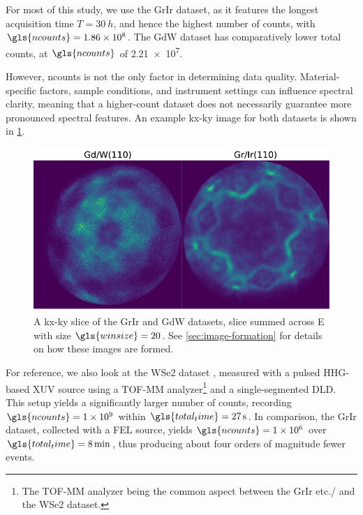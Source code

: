 For most of this study, we use the \gls{GrIr} dataset, as it features the longest acquisition time $T=\qty{30}{h}$, and hence the highest number of counts, with $\gls{ncounts}=\num{1.86e8}$. The \gls{GdW} dataset has comparatively lower total counts, at $\gls{ncounts}$ of \num{2.21e7}. 

However, \gls{ncounts} is not the only factor in determining data quality. Material-specific factors, sample conditions, and instrument settings can influence spectral clarity, meaning that a higher-count dataset does not necessarily guarantee more pronounced spectral features. An example \gls{kx}-\gls{ky} image for both datasets is shown in \cref{fig:all-hextof-datasets-kxky}.

\begin{figure}[h]
    \centering
    \includegraphics[width=1\linewidth]{images/datasets_2_kx_ky.pdf}
    \caption{A \gls{kx}-\gls{ky} slice of the \gls{GrIr} and \gls{GdW} datasets, slice summed across \gls{E} with size $\gls{winsize}=\num{20}$. See \cref{sec:image-formation} for details on how these images are formed.}
    \label{fig:all-hextof-datasets-kxky}
\end{figure}

For reference, we also look at the \gls{WSe2} dataset \cite{maklarTimeresolvedARPESRAW2022}, measured with a pulsed \gls{HHG}-based \gls{XUV} source using a \gls{TOF}-\gls{MM} analyzer\footnote{The \gls{TOF}-\gls{MM} analyzer being the common aspect between the \gls{GrIr} etc./ and the \gls{WSe2} dataset.} and a single-segmented \gls{DLD}. This setup yields a significantly larger number of counts, recording $\gls{ncounts}=\num{1e9}$ within $\gls{total_time}=\qty{27}{s}$. In comparison, the \gls{GrIr} dataset, collected with a \gls{FEL} source, yields $\gls{ncounts} = \num{1e6}$ over $\gls{total_time} = \qty{8}{\min}$, thus producing about four orders of magnitude fewer events.

